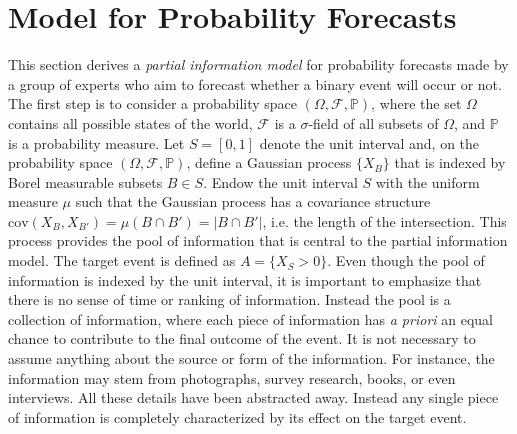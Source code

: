 \documentclass[11pt,twoside]{article}
\renewcommand{\P}{\mathbb{P}}
\theoremstyle{definition}
\theoremstyle{definition}
\begin{document}
\section{Model for Probability Forecasts}
\label{Model}
This section derives a \textit{partial information model} for probability forecasts made by a group of experts who aim to forecast whether a binary event will occur or not. The first step is to consider a probability space  $(\Omega, \mathcal{F}, \P)$, where the set $\Omega$ contains all possible states of the world,  $\mathcal{F}$ is a $\sigma$-field of all subsets of $\Omega$, and $\P$ is a probability measure. Let $S = [0,1]$ denote the unit interval and, on the probability space $(\Omega, \mathcal{F}, \P)$, define a Gaussian process $\{ X_B \}$ that is indexed by Borel measurable subsets $B \in S$. Endow the unit interval $S$ with the uniform measure $\mu$ such that the Gaussian process has a covariance structure $\text{cov}(X_B, X_{B'}) = \mu(B \cap B') = |B \cap B'|$, i.e. the length of the intersection. This process provides the pool of information that is central to the partial information model. The target event is defined as $A = \{ X_{S} > 0\}$. Even though the pool of information is indexed by the unit interval, it is important to emphasize that there is no sense of time or ranking of information. Instead the pool is a collection of information, where each piece of information has \textit{a priori} an equal chance to contribute to the final outcome of the event. It is not necessary to assume anything about the source or form of the information. For instance, the information may stem from photographs, survey research, books, or even interviews. All these details have been abstracted away. Instead any single piece of information is completely characterized by its effect on the target event. 
\end{document}
